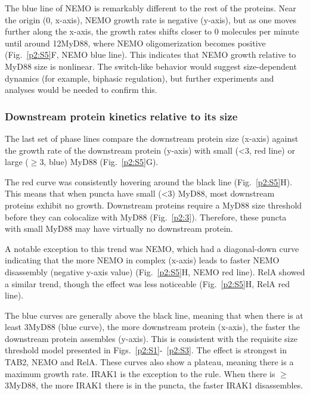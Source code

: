 The blue line of NEMO is remarkably different to the rest of the proteins. Near the origin (0\times, x-axis), NEMO growth rate is negative (y-axis), but as one moves further along the x-axis, the growth rates shifts closer to 0 molecules per minute until around 12\times MyD88, where NEMO oligomerization becomes positive (Fig.~\ref{p2:S5}F, NEMO blue line). This indicates that NEMO growth relative to MyD88 size is nonlinear. The switch-like behavior would suggest size-dependent dynamics (for example, biphasic regulation), but further experiments and analyses would be needed to confirm this.

\subsubsection{Downstream protein kinetics relative to its size}
The last set of phase lines compare the downstream protein size (x-axis) against the growth rate of the downstream protein (y-axis) with small (<3\times, red line) or large ($\geq$3\times, blue) MyD88 (Fig.~\ref{p2:S5}G).

The red curve was consistently hovering around the black line (Fig.~\ref{p2:S5}H). This means that when puncta have small (<3\times) MyD88, most downstream proteins exhibit no growth. Downstream proteins require a MyD88 size threshold before they can colocalize with MyD88 (Fig.~\ref{p2:3}). Therefore, these puncta with small MyD88 may have virtually no downstream protein.

A notable exception to this trend was NEMO, which had a diagonal-down curve indicating that the more NEMO in complex (x-axis) leads to faster NEMO disassembly (negative y-axis value) (Fig.~\ref{p2:S5}H, NEMO red line). RelA showed a similar trend, though the effect was less noticeable (Fig.~\ref{p2:S5}H, RelA red line). 

The blue curves are generally above the black line, meaning that when there is at least 3\times MyD88 (blue curve), the more downstream protein (x-axis), the faster the downstream protein assembles (y-axis). This is consistent with the requisite size threshold model presented in Figs.~\ref{p2:S1}-~\ref{p2:S3}. The effect is strongest in TAB2, NEMO and RelA. These curves also show a plateau, meaning there is a maximum growth rate. IRAK1 is the exception to the rule. When there is $\geq$3\times MyD88, the more IRAK1 there is in the puncta, the faster IRAK1 disassembles.



